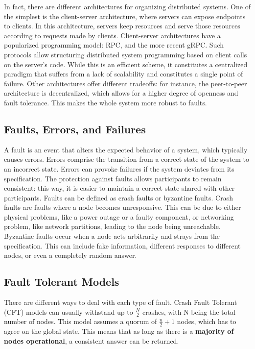 \documentclass[12pt,a4paper]{article}
\begin{document}
In fact, there are different architectures for organizing distributed systems. One of the simplest is the client-server architecture, where servers can expose endpoints to clients.
In this architecture, servers keep resources and serve those resources according to requests made by clients. Client-server architectures have a popularized programming model: RPC, and the more recent gRPC. Such protocols allow structuring distributed system programming based on client calls on the server's code. While this is an efficient scheme, it constitutes a centralized paradigm that suffers from a lack of scalability and constitutes a single point of failure. Other architectures offer different tradeoffs: for instance, the peer-to-peer architecture is decentralized, which allows for a higher degree of openness and fault tolerance. This makes the whole system more robust to faults. 

\subsection{Faults, Errors, and Failures}
A fault is an event that alters the expected behavior of a system, which typically causes errors. Errors comprise the transition from a correct state of the system to an incorrect state. Errors can provoke failures if the system deviates from its specification. The protection against faults allows participants to remain consistent: this way, it is easier to maintain a correct state shared with other participants. Faults can be defined as crash faults or byzantine faults. Crash faults are faults where a node becomes unresponsive. This can be due to either physical problems, like a power outage or a faulty component, or networking problem, like network partitions, leading to the node being unreachable. Byzantine faults occur when a node acts arbitrarily and strays from the specification. This can include fake information, different responses to different nodes, or even a completely random answer.

\subsection{Fault Tolerant Models}
There are different ways to deal with each type of fault.
Crash Fault Tolerant (CFT) models can usually withstand up to $\frac{N}{2}$ crashes, with N being the total number of nodes. This model assumes a quorum of $\frac{n}{2}+1$ nodes, which has to agree on the global state. This means that as long as there is a \textbf{majority of nodes operational}, a consistent answer can be returned. 
\end{document}
